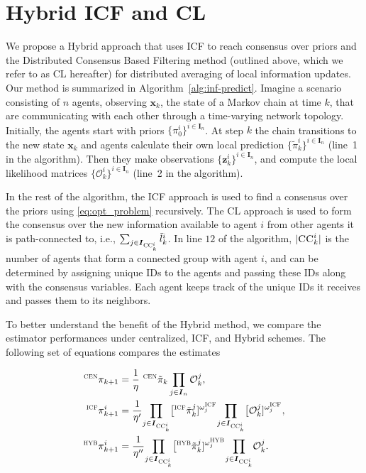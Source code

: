 \documentclass[conference]{IEEEtran}
\newcommand{\vect}[1]{{\mathbf{#1}}}
\theoremstyle{remark}
\newcommand{\bIn}{\boldsymbol{I}_{{n}}}
\newcommand{\bIs}[1]{\boldsymbol{I}_{#1}}  %
\newcommand{\suf}[1]{\textsc{\tiny #1}}  %
\begin{document}
\section{Hybrid ICF and CL} \label{subsec:Method}
We propose a Hybrid approach that uses ICF to reach consensus over priors and 
the Distributed Consensus Based Filtering method (outlined above, which we 
refer to as CL hereafter) for distributed averaging of local information 
updates. Our method is summarized in Algorithm~\ref{alg:inf-predict}. Imagine a 
scenario consisting of $n$ agents, observing $\vect{x}_k$, the state of a 
Markov chain at time $k$, that are communicating with each other through a 
time-varying network topology. Initially, the agents start with  priors 
$\{{\pi}_0^i\}^{i \in \bIn} $. At step $k$ the chain transitions to the new 
state $\vect{x}_k$ and agents calculate their own local prediction 
$\{\tilde{{\pi}}_k^i\}^{i \in \bIn} $ (line~1 in the algorithm). Then they make 
observations $\{\vect{z}_k^i\}^{i \in \bIn} $, and compute the local likelihood  
matrices $\{\mathcal{O}_k^i\}^{i \in \bIn} $ (line~2 in the algorithm).

In the rest of the algorithm, the ICF approach is used to find a 
consensus over the priors using \eqref{eq:opt_problem} recursively. The CL 
approach is used to form the consensus over the new information available to 
agent $i$ from other agents it is path-connected to, i.e., 
$\textstyle \sum_{{j \in \bIs{\suf{CC}^i_k} }}  \tilde{l}_k^i$. In line 
$12$ of the algorithm, $|\textsc{CC}^i_k|$ is the number of agents that form a 
connected 
group with agent $i$, and can be determined by assigning unique IDs to the 
agents and 
passing these IDs along with the consensus variables. Each agent keeps track of 
the unique IDs it receives and passes them to its neighbors.

To better understand the benefit of the Hybrid method, we compare the estimator 
performances under centralized, ICF, and Hybrid schemes. The following set of 
equations compares the estimates



\begin{align}
{}^{\suf{CEN}}{\pi}_{k+1}&= \frac{1}{\eta}\,\,{}^{\suf{CEN}}\tilde{\pi}_k  
\prod_{j \in \bIn}  \mathcal{O}_k^j,\label{CEN-COMP}\\
{}^{\suf{ICF}}{\pi}_{k+1}^i&= \frac{1}{\eta'}{\prod_{j \in 
		\bIs{\suf{CC}^i_k} } 
}  
\big[{}^\mathcal{\suf{ICF}}\tilde{\pi}_k^j]^{\omega_{j}^\suf{ICF}}{\prod_{j
		\in \bIs{\suf{CC}^i_k} } 
}  
\big[\mathcal{O}_k^j]^{\omega_{j}^\suf{ICF}},\label{ICF-COMP}\\
{}^{\suf{HYB}}{\pi}_{k+1}^i&= \frac{1}{\eta''}{\prod_{j \in \bIs{\suf{CC}^i_k} 
	} 
}  
\big[{}^\mathcal{\suf{HYB}}\tilde{\pi}_k^j]^{\omega_{j}^\suf{HYB}}{\prod_{j
		\in \bIs{\suf{CC}^i_k} } \label{HYB-COMP}
}  
\mathcal{O}_k^j.
\end{align}
\end{document}
